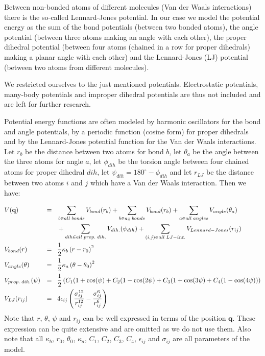 \documentclass[11pt,a4paper]{article}
\begin{document}
Between non-bonded atoms of different molecules (Van der Waals interactions) there is the so-called Lennard-Jones potential. In our case we model the potential energy as the sum of the bond potentials (between two bonded atoms), the angle potential (between three atoms making an angle with each other), the proper dihedral potential (between four atoms (chained in a row for proper dihedrals) making a planar angle with each other) and the Lennard-Jones (LJ) potential (between two atoms from different molecules). 

We restricted ourselves to the just mentioned potentials. Electrostatic potentials, many-body potentials and improper dihedral potentials are thus not included and are left for further research. 

Potential energy functions are often modeled by harmonic oscillators for the bond and angle potentials, by a periodic function (cosine form) for proper dihedrals and by the Lennard-Jones potential function for the Van der Waals interactions. Let $r_b$ be the distance between two atoms for bond $b$, let $\theta_a$ be the angle between the three atoms for angle $a$, let $\phi_{dih}$ be the torsion angle between four chained atoms for proper dihedral $dih$, let $\psi_{dih} = 180^\circ - \phi_{dih}$ and let $r_{LJ}$ be the distance between two atoms $i$ and $j$ which have a Van der Waals interaction. Then we have:

\begin{align*}
& V(\textbf{q}) & = & \; \; \; \sum\limits_{b\in all \; bonds}V_{bond}(r_b) +  \sum\limits_{b\in a;; \; bonds}V_{bond}(r_b) +  \sum\limits_{a\in all \; angles}V_{angle}(\theta_a) \\
& \textcolor{white}{.} & \textcolor{white}{.} & \; \; \; +  \sum\limits_{dih\in all \; prop. \; dih.}V_{dih.}(\psi_{dih}) + \sum\limits_{(i,j)\in all \; LJ-int.}V_{Lennard-Jones}(r_{ij}) \\
& V_{bond}(r) & = & \; \; \; \frac{1}{2}\kappa_{b}\left( r - r_0 \right)^2 \\
& V_{angle}(\theta) & = & \; \; \; \frac{1}{2}\kappa_{a}\left(\theta - \theta_0 \right)^2 \\
& V_{prop.\; dih.}(\psi) & = & \; \; \; \frac{1}{2}\left(C_1(1+\cos(\psi) + C_2(1-\cos(2\psi) + C_3(1+\cos(3\psi) + C_4(1-\cos(4\psi)) \right) \\
& V_{LJ}(r_{ij}) & = & \; \; \; 4\epsilon_{ij}\left(\frac{\sigma_{ij}^{12}}{r_{ij}^{12}} - \frac{\sigma_{ij}^{6}}{r_{ij}^{6}}\right)
\end{align*}
Note that $r$, $\theta$, $\psi$ and $r_{ij}$ can be well expressed in terms of the position $\textbf{q}$. These expression can be quite extensive and are omitted as we do not use them. Also note that all $\kappa_b$, $r_0$, $\theta_0$, $\kappa_{a}$, $C_1$, $C_2$, $C_3$, $C_4$, $\epsilon_{ij}$ and $\sigma_{ij}$ are all parameters of the model. 
\end{document}
